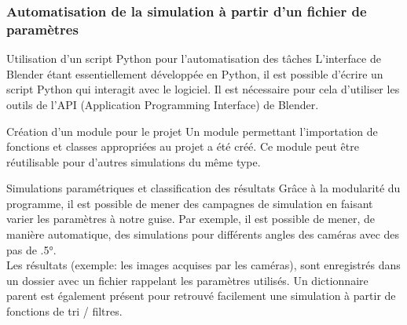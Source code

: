\documentclass[8pt]{beamer}
\begin{document}
	\begin{frame}
		\frametitle{Automatisation de la simulation à partir d'un fichier de paramètres}
		\begin{block}{Utilisation d'un script Python pour l'automatisation des tâches}
			L'interface de Blender étant essentiellement développée en Python, il est possible d'écrire un script Python qui interagit avec le logiciel. Il est nécessaire pour cela d'utiliser les outils de l'API (Application Programming Interface) de Blender.
		\end{block}
		\begin{block}{Création d'un module pour le projet}
			Un module permettant l'importation de fonctions et classes appropriées au projet a été créé. Ce module peut être réutilisable pour d'autres simulations du même type.
		\end{block}
		\begin{block}{Simulations paramétriques et classification des résultats}
			Grâce à la modularité du programme, il est possible de mener des campagnes de simulation en faisant varier les paramètres à notre guise. Par exemple, il est possible de mener, de manière automatique, des simulations pour différents angles des caméras avec des pas de \ang{.5}.
			\\Les résultats (exemple: les images acquises par les caméras), sont enregistrés dans un dossier avec un fichier rappelant les paramètres utilisés. Un dictionnaire parent est également présent pour retrouvé facilement une simulation à partir de fonctions de tri / filtres.
		\end{block}
	\end{frame}
\end{document}
